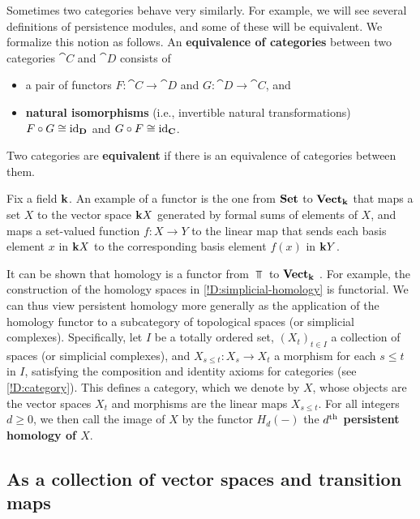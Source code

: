 \begin{definition}
  Sometimes two categories behave very similarly. For example, we will see several definitions of persistence modules, and some of these will be equivalent. We formalize this notion as follows. An \textbf{equivalence of categories} between two categories $\cat{C}$ and $\cat{D}$ consists of
  \begin{itemize}
    \item a pair of functors $F \colon \cat{C} \to \cat{D}$ and $G \colon \cat{D} \to \cat{C}$, and
    \item {}\textbf{natural isomorphisms} (i.e., invertible natural transformations) $F \circ G \cong \operatorname{id}_{\mathbf{D}}$ and $G \circ F \cong \operatorname{id}_{\mathbf{C}}$.
  \end{itemize}
  Two categories are \textbf{equivalent} if there is an equivalence of categories between them.
\end{definition}

\begin{example}
\label{!Ex:free-vector-space}
  Fix a field $\mathbf{k}$. An example of a functor is the one from $\operatorname{\mathbf{Set}}$ to $\operatorname{\mathbf{Vect}}_{\mathbf{k}}$ that maps a set $X$ to the vector space $\mathbf{k} X$ generated by formal sums of elements of $X$, and maps a set-valued function $f \colon X \to Y$ to the linear map that sends each basis element $x$ in $\mathbf{k} X$ to the corresponding basis element $f(x)$ in $\mathbf{k} Y$.
\end{example}

It can be shown that homology is a functor from $\Top$ to $\operatorname{\mathbf{Vect}}_{\mathbf{k}}$ \cite{Hatcher2002}. For example, the construction of the homology spaces in \cref{!D:simplicial-homology} is functorial. We can thus view persistent homology more generally as the application of the homology functor to a subcategory of topological spaces (or simplicial complexes). Specifically, let $I$ be a totally ordered set, $(X_t)_{t \in I}$ a collection of spaces (or simplicial complexes), and $X_{s \leq t} \colon X_s \to X_t$ a morphism for each $s \leq t$ in $I$, satisfying the composition and identity axioms for categories (see \cref{!D:category}). This defines a category, which we denote by $X$, whose objects are the vector spaces $X_t$ and morphisms are the linear maps $X_{s \leq t}$. For all integers $d \geq 0$, we then call the image of $X$ by the functor $H_d(-)$ the \textbf{$d^{\text{th}}$ persistent homology of $X$}.

\subsection{As a collection of vector spaces and transition maps}
\label{SS:vector-spaces}

